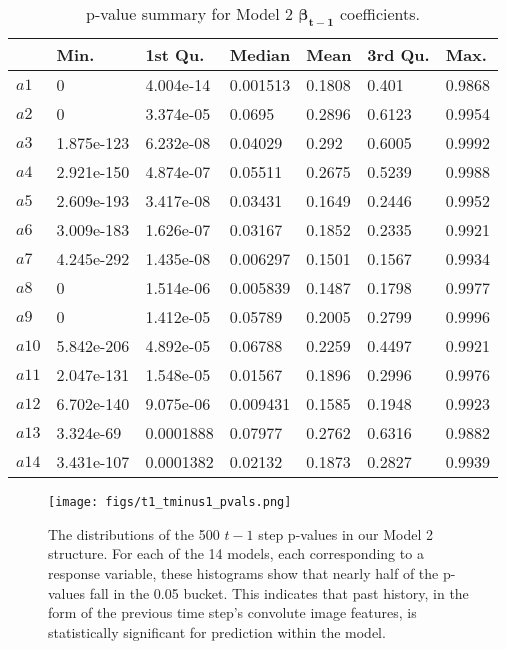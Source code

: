 \documentclass[master]{subfiles}
\begin{document}
\begin{table}[H]
\centering
\caption{p-value summary for Model 2 $\bm{\beta_{t-1}}$ coefficients.}
\begin{tabular}{@{}lllllll@{}}
\toprule
    & Min.       & 1st Qu.   & Median   & Mean   & 3rd Qu. & Max.   \\ \midrule
$a1$  & 0          & 4.004e-14 & 0.001513 & 0.1808 & 0.401   & 0.9868 \\
$a2$  & 0          & 3.374e-05 & 0.0695   & 0.2896 & 0.6123  & 0.9954 \\
$a3$  & 1.875e-123 & 6.232e-08 & 0.04029  & 0.292  & 0.6005  & 0.9992 \\
$a4$  & 2.921e-150 & 4.874e-07 & 0.05511  & 0.2675 & 0.5239  & 0.9988 \\
$a5$  & 2.609e-193 & 3.417e-08 & 0.03431  & 0.1649 & 0.2446  & 0.9952 \\
$a6$  & 3.009e-183 & 1.626e-07 & 0.03167  & 0.1852 & 0.2335  & 0.9921 \\
$a7$  & 4.245e-292 & 1.435e-08 & 0.006297 & 0.1501 & 0.1567  & 0.9934 \\
$a8$  & 0          & 1.514e-06 & 0.005839 & 0.1487 & 0.1798  & 0.9977 \\
$a9$  & 0          & 1.412e-05 & 0.05789  & 0.2005 & 0.2799  & 0.9996 \\
$a10$ & 5.842e-206 & 4.892e-05 & 0.06788  & 0.2259 & 0.4497  & 0.9921 \\
$a11$ & 2.047e-131 & 1.548e-05 & 0.01567  & 0.1896 & 0.2996  & 0.9976 \\
$a12$ & 6.702e-140 & 9.075e-06 & 0.009431 & 0.1585 & 0.1948  & 0.9923 \\
$a13$ & 3.324e-69  & 0.0001888 & 0.07977  & 0.2762 & 0.6316  & 0.9882 \\
$a14$ & 3.431e-107 & 0.0001382 & 0.02132  & 0.1873 & 0.2827  & 0.9939 \\ \bottomrule
\end{tabular}
\label{table:p3}
\end{table}
\begin{figure}[H]
\vspace{6em}
\centering
\texttt{[image: figs/t1\_tminus1\_pvals.png]}
\caption{The distributions of the 500 $t-1$ step p-values in our Model 2 structure.  For each of the 14 models, each corresponding to a response variable, these histograms show that nearly half of the p-values fall in the 0.05 bucket.  This indicates that past history, in the form of the previous time step's convolute image features, is statistically significant for prediction within the model.}
\label{fig:p_dist}
\end{figure}
\newpage
\end{document}
